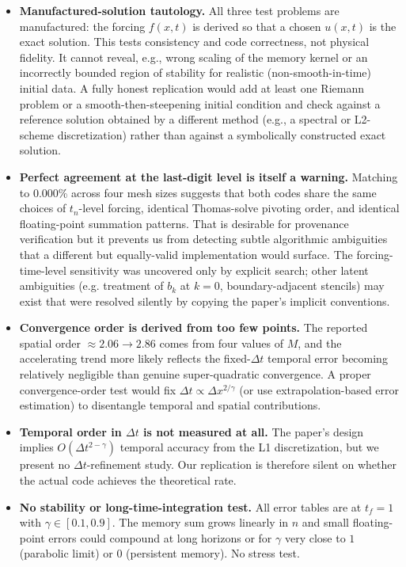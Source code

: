 \documentclass[11pt]{article}
\begin{document}
\begin{itemize}[leftmargin=1.2em]
\item \textbf{Manufactured-solution tautology.} All three test problems are manufactured: the
forcing $f(x,t)$ is derived so that a chosen $u(x,t)$ is the exact solution. This tests
consistency and code correctness, not physical fidelity. It cannot reveal, e.g., wrong scaling
of the memory kernel or an incorrectly bounded region of stability for realistic
(non-smooth-in-time) initial data. A fully honest replication would add at least one
Riemann problem or a smooth-then-steepening initial condition and check against a reference
solution obtained by a different method (e.g., a spectral or L2-scheme discretization) rather
than against a symbolically constructed exact solution.

\item \textbf{Perfect agreement at the last-digit level is itself a warning.} Matching to
0.000\% across four mesh sizes suggests that both codes share the same choices of $t_n$-level
forcing, identical Thomas-solve pivoting order, and identical floating-point summation
patterns. That is desirable for provenance verification but it prevents us from detecting
subtle algorithmic ambiguities that a different but equally-valid implementation would surface.
The forcing-time-level sensitivity was uncovered only by explicit search; other latent
ambiguities (e.g. treatment of $b_k$ at $k{=}0$, boundary-adjacent stencils) may exist that
were resolved silently by copying the paper's implicit conventions.

\item \textbf{Convergence order is derived from too few points.} The reported spatial order
$\approx 2.06 \to 2.86$ comes from four values of $M$, and the accelerating trend more likely
reflects the fixed-$\Delta t$ temporal error becoming relatively negligible than genuine
super-quadratic convergence. A proper convergence-order test would fix
$\Delta t \propto \Delta x^{2/\gamma}$ (or use extrapolation-based error estimation) to
disentangle temporal and spatial contributions.

\item \textbf{Temporal order in $\Delta t$ is not measured at all.} The paper's design implies
$O(\Delta t^{2-\gamma})$ temporal accuracy from the L1 discretization, but we present no
$\Delta t$-refinement study. Our replication is therefore silent on whether the actual code
achieves the theoretical rate.

\item \textbf{No stability or long-time-integration test.} All error tables are at $t_f = 1$
with $\gamma \in [0.1, 0.9]$. The memory sum grows linearly in $n$ and small floating-point
errors could compound at long horizons or for $\gamma$ very close to $1$ (parabolic limit) or
$0$ (persistent memory). No stress test.


\end{itemize}
\end{document}
